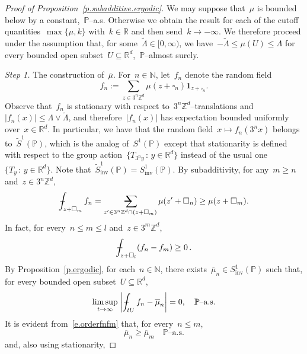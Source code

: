 \documentclass[11pt,twoside]{article} %
\makeatletter
\let\oldsquare\square %
\renewcommand{\square}{\oldsquare}
\numberwithin{equation}{section}
\theoremstyle{definition}
\let\originalleft\left
\let\originalright\right
\renewcommand{\left}{\mathopen{}\mathclose\bgroup\originalleft}
\renewcommand{\right}{\aftergroup\egroup\originalright}
\newcommand*{\N}{\ensuremath{\mathbb{N}}}
\newcommand*{\R}{\ensuremath{\mathbb{R}}}
\newcommand*{\Zd}{\ensuremath{\mathbb{Z}^d}}
\newcommand*{\Rd}{\ensuremath{\mathbb{R}^d}}
\renewcommand*{\tilde}{\widetilde}
\newcommand{\inv}{\mathrm{inv}}
\newcommand{\cu}{\square}
\renewcommand{\P}{\mathbb{P}}
\newcommand{\indc}{\boldsymbol{1}}
\newcommand{\avsum}{\mathop{\mathpalette\avsuminner\relax}\displaylimits}
\newcommand\avsuminner[2]{%
  {\sbox0{$\m@th#1\sum$}%
   \vphantom{\usebox0}%
   \ooalign{%
     \hidewidth
     \smash{\,\rule[.23em]{8.8pt}{1.1pt} \relax}%
     \hidewidth\cr
   ~$\m@th#1\sum$\cr
   }%
  }%
}
\def\Xint#1{\mathchoice
{\XXint\displaystyle\textstyle{#1}}%
{\XXint\textstyle\scriptstyle{#1}}%
{\XXint\scriptstyle\scriptscriptstyle{#1}}%
{\XXint\scriptscriptstyle\scriptscriptstyle{#1}}%
\!\int}
\def\XXint#1#2#3{{\setbox0=\hbox{$#1{#2#3}{\int}$}
\vcenter{\hbox{$#2#3$}}\kern-.5\wd0}}
\def\fint{\Xint-}
\makeatother
\begin{document}
\begin{proof}[{Proof of Proposition~\ref{p.subadditive.ergodic}}]
We may suppose that~$\mu$ is bounded below by a constant,~$\P$--a.s. Otherwise we obtain the result for each of the cutoff quantities~$\max\{ \mu ,  k\}$ with~$k\in\R$ and then send~$k\to -\infty$. We therefore proceed under the assumption that,  for some~$\tilde{\Lambda}\in [0,\infty)$, we have~$-\tilde{\Lambda} \leq \mu(U) \leq \Lambda$ for every bounded open subset~$U\subseteq\Rd$,~$\P$--almost surely.

\smallskip

\emph{Step 1.} 
The construction of~$\overline{\mu}$.
For~$n\in\N$, let~$f_n$ denote the random field 
\begin{equation*}
f_n:= \sum_{z\in 3^n\Zd} \mu(z+\cu_n)  \indc_{z+\cu_n}.
\end{equation*}
Observe that~$f_n$ is stationary with respect to~$3^n\Zd$--translations and~$|f_n(x)|\leq\Lambda \vee \tilde{\Lambda}$, and therefore~$|f_n(x)|$ has expectation bounded uniformly over~$x\in\Rd$. In particular, we have that the random field~$x\mapsto f_n(3^{n}x)$ belongs to~$\tilde{S}^1(\P)$, which is the analog of~$S^1(\P)$ except that stationarity is defined with respect to the group action~$\{ T_{3^n y} \,:\, y\in\Rd\}$ instead of the usual one~$\{ T_y \,:\, y\in\Rd\}$. Note that~$\tilde{S}^1_{\mathrm{inv}}(\P)=S^1_{\mathrm{inv}}(\P)$.
By  subadditivity, for any~$m\geq n$ and~$z\in 3^n\Zd$, 
\begin{align}
\label{e.subbaddtof}
\fint_{z+\cu_m} f_n
= \avsum_{z' \in 3^n\Zd \cap (z+\cu_m)} 
\mu(z'+\cu_n)
\geq 
\mu(z+\cu_m).
\end{align}
In fact, for every~$n\leq m \leq l$ and~$z\in 3^m\Zd$, 
\begin{align}
\label{e.orderfnfm}
\fint_{z+\cu_l} ( f_n - f_m )
\geq 
0
\,.
\end{align}
By Proposition~\ref{p.ergodic}, for each~$n\in\N$, there exists~$\overline{\mu}_n\in S^1_\inv(\P)$ such that, for every bounded open subset~$U\subseteq \Rd$, 
\begin{equation}
\label{e.fnconvergemun}
\limsup_{t\to \infty} \
\left|\fint_{tU} f_n- \overline{\mu}_n \right| 
=0,
\quad\mbox{$\P$--a.s.}
\end{equation}
It is evident from~\eqref{e.orderfnfm} that, for every~$n\leq m$, 
\begin{equation}
\label{e.overlinemumn.mono}
\overline{\mu}_n
\geq 
\overline{\mu}_m 
\quad \mbox{$\P$--a.s.}
\end{equation}
and, also using stationarity, 

\end{proof}
\end{document}
